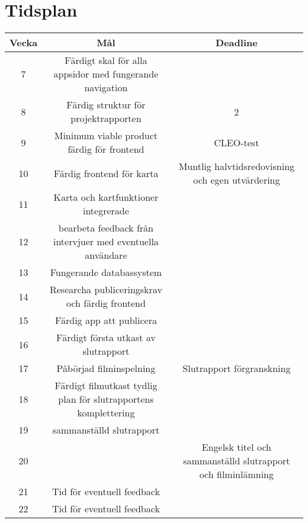 \section{Tidsplan}

\begin{center}
    \begin{tabular}{|c|c|c|}
      \hline
      \textbf{Vecka} & \textbf{Mål} & \textbf{Deadline} \\
      \hline
        7 &  Färdigt skal för alla appsidor med fungerande navigation &   \\
      \hline
        8 &  Färdig struktur för projektrapporten &  2 \\
      \hline
        9 &  Minimum viable product färdig för frontend  &  CLEO-test \\
      \hline
       10 &  Färdig frontend för karta &  Muntlig halvtidsredovisning och egen utvärdering \\
      \hline
       11 &  Karta och kartfunktioner integrerade &   \\
      \hline
       12 & bearbeta feedback från intervjuer med eventuella användare &  \\
      \hline
        13 &  Fungerande databassystem  &   \\
      \hline
       14 &  Researcha publiceringskrav och färdig frontend &   \\
      \hline
       15 &  Färdig app att publicera &   \\
      \hline
       16 &  Färdigt första utkast av slutrapport &   \\
       \hline
       17 & Påbörjad filminspelning  &  Slutrapport förgranskning \\
       \hline
       18 &  Färdigt filmutkast tydlig plan för slutrapportens komplettering &   \\
       \hline
       19 & sammanställd slutrapport &  \\
       \hline
       20 &   &  Engelsk titel och sammanställd slutrapport och filminlämning\\
       \hline
       21 &  Tid för eventuell feedback &  \\
       \hline
       22 &  Tid för eventuell feedback  &   \\
      \hline
    \end{tabular}
  \end{center}